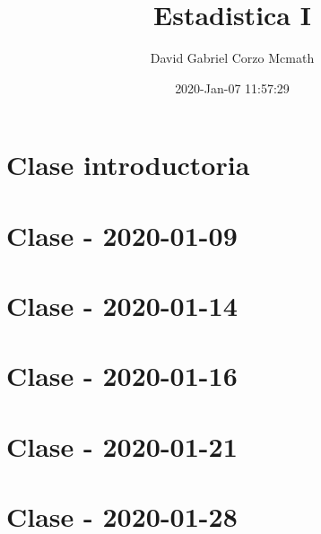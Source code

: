 \documentclass{book}
\title{Estadistica I }
\author{David Gabriel Corzo Mcmath}
\date{2020-Jan-07 11:57:29}
\begin{document}
\maketitle
\tableofcontents

\chapter{Clase introductoria}


\chapter{Clase - 2020-01-09}


\chapter{Clase - 2020-01-14}


\chapter{Clase - 2020-01-16}


\chapter{Clase - 2020-01-21}


\chapter{Clase - 2020-01-28}

\end{document}
